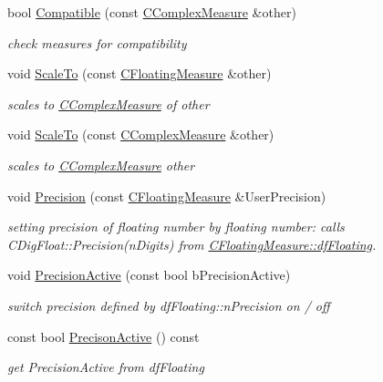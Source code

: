 \begin{DoxyCompactItemize}
bool \hyperlink{classCFloatingMeasure_a5cf69c287abe4e2f65242e97093f7595}{Compatible} (const \hyperlink{classCComplexMeasure}{C\+Complex\+Measure} \&other)
\begin{DoxyCompactList}\small\item\em check measures for compatibility \end{DoxyCompactList}\item 
void \hyperlink{classCFloatingMeasure_aa0a16f8516d047576b588389504c0996}{Scale\+To} (const \hyperlink{classCFloatingMeasure}{C\+Floating\+Measure} \&other)
\begin{DoxyCompactList}\small\item\em scales to \hyperlink{classCComplexMeasure}{C\+Complex\+Measure} of other \end{DoxyCompactList}\item 
void \hyperlink{classCFloatingMeasure_a841b94d2883274e67999688fad40d538}{Scale\+To} (const \hyperlink{classCComplexMeasure}{C\+Complex\+Measure} \&other)
\begin{DoxyCompactList}\small\item\em scales to \hyperlink{classCComplexMeasure}{C\+Complex\+Measure} other \end{DoxyCompactList}\item 
void \hyperlink{classCFloatingMeasure_abaedeff78fb7009c788df5a016bc46d5}{Precision} (const \hyperlink{classCFloatingMeasure}{C\+Floating\+Measure} \&User\+Precision)
\begin{DoxyCompactList}\small\item\em setting precision of floating number by floating number\+: calls C\+Dig\+Float\+::\+Precision(n\+Digits) from \hyperlink{classCFloatingMeasure_aa0cec9966c6c08db75c493e44396cfc2}{C\+Floating\+Measure\+::df\+Floating}. \end{DoxyCompactList}\item 
void \hyperlink{classCFloatingMeasure_a4fe4d60589da6d4c7f09cb09fbea730b}{Precision\+Active} (const bool b\+Precision\+Active)
\begin{DoxyCompactList}\small\item\em switch precision defined by df\+Floating\+::n\+Precision on / off \end{DoxyCompactList}\item 
const bool \hyperlink{classCFloatingMeasure_a90d47ac476295db3c208cb484cd75764}{Precison\+Active} () const
\begin{DoxyCompactList}\small\item\em get Precision\+Active from df\+Floating \end{DoxyCompactList}\item 

\end{DoxyCompactItemize}
